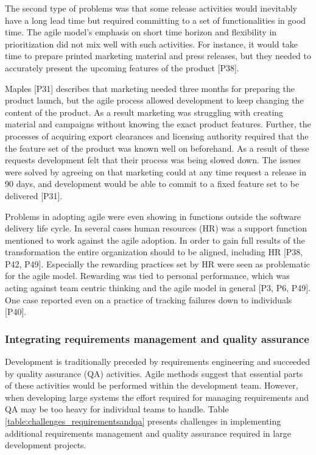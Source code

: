 \documentclass[preprint,authoryear,12pt]{elsarticle}
\begin{document}
The second type of problems was that some release activities would inevitably
have a long lead time but required committing to a set of functionalities in
good time. The agile model's emphasis on short time horizon and flexibility in
prioritization did not mix well with such activities.
For instance, it would take time to prepare printed marketing material and press
releases, but they needed to accurately present the upcoming features of the
product [P38].

Maples [P31] describes that marketing needed three months for preparing the
product launch, but the agile process allowed development to keep changing the
content of the product. As a result marketing was struggling with creating
material and campaigns without knowing the exact product features. Further, the
processes of acquiring export clearances and licensing authority required that
the the feature set of the product was known well on beforehand.
As a result of these requests development felt that their process was being
slowed down. The issues were solved by agreeing on that marketing could at any
time request a release in 90 days, and development would be able to commit to a
fixed feature set to be delivered [P31].


Problems in adopting agile were even showing in functions outside the software
delivery life cycle. In several cases human resources (HR) was a support function
mentioned to work against the agile adoption. In order to gain full results of
the transformation the entire organization should to be aligned, including HR
[P38, P42, P49].
Especially the rewarding practices set by HR were seen as problematic for the
agile model. Rewarding was tied to personal performance, which was acting
against team centric thinking and the agile model in general [P3, P6, P49].
One case reported even on a practice of tracking failures down to individuals
[P40].


\subsubsection{Integrating requirements management and quality assurance}

Development is traditionally preceded by requirements engineering and succeeded
by quality assurance (QA) activities. Agile methods suggest that essential parts
of these activities would be performed within the development team. However,
when developing large systems the effort required for managing requirements and
QA may be too heavy for individual teams to handle. Table
\ref{table:challenges_requirementsandqa} presents challenges in implementing
additional requirements management and quality assurance required in large
development projects.
\end{document}
